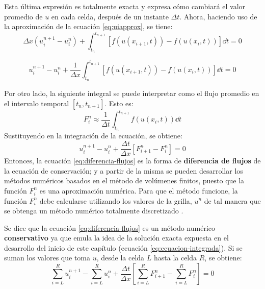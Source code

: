 \documentclass[12pt]{article}
\begin{document}
	Esta última expresión es totalmente exacta y expresa cómo cambiará el valor promedio de $u$ en cada celda, después de un instante $\Delta t$. Ahora, haciendo uso de la aproximación de la ecuación \ref{eq:uiapprox}, se tiene:
	\begin{equation}
		 \Delta x\left( u_{i}^{n+1} - u_{i}^{n}\right)   + \int_{t_n}^{t_{n+1}}\left[ f(u(x_{i+1} ,t)) - f(u(x_{i},t))\right]\dd{t} = 0 
	\end{equation}

	\begin{equation}
		u_{i}^{n+1} - u_{i}^{n} + \frac{1}{\Delta x}\int_{t_n}^{t_{n+1}}\left[ f(u(x_{i+1} ,t)) - f(u(x_{i},t))\right]\dd{t} = 0 
	\end{equation}

	Por otro lado, la siguiente integral se puede interpretar como el flujo promedio en el intervalo temporal $[t_n,t_{n+1}]$. Esto es:
	\begin{equation}
		F_{i}^{n} \approx \frac{1}{\Delta t} \int_{t_n}^{t_{n+1}} f(u(x_i,t)) \dd{t}
		\label{eq:flujo_promedio}
	\end{equation}
	Sustituyendo en la integración de la ecuación, se obtiene:
	\begin{equation}
		u_{i}^{n+1} - u_{i}^{n} + \frac{\Delta t}{\Delta x}\left[ F_{i+1}^n - F_{i}^{n}\right] = 0
		\label{eq:diferencia-flujos}
	\end{equation}
	Entonces, la ecuación \ref{eq:diferencia-flujos} es la forma de \textbf{diferencia de flujos} de la ecuación de conservación; y a partir de la misma se pueden desarrollar los métodos numéricos basados en el método de volúmenes finitos, puesto que la función $F_{i}^{n}$ es una aproximación numérica. Para que el método funcione, la función $F_{i}^{n}$ debe calcularse utilizando los valores de la grilla, $u^{n}$ de tal manera que se obtenga un método numérico totalmente discretizado \cite{LeVeque1998}. 
	
	Se dice que la ecuación \ref{eq:diferencia-flujos} es un método numérico \textbf{conservativo} ya que emula la idea de la solución exacta expuesta en el desarrollo del inicio de este capítulo (ecuación \ref{eq:ecuacion-integrada}). Si se suman los valores que toma $u$, desde la celda $L$ hasta la celda $R$, se obtiene:
	\begin{equation}
		\sum_{i=L}^{R} u_{i}^{n+1} - \sum_{i=L}^{R}  u_{i}^{n} + \frac{\Delta t}{\Delta x}\left[ \sum_{i=L}^{R}F_{i+1}^{n} - \sum_{i=L}^{R}F_{i}^{n}\right] =0
	\end{equation}
		
\end{document}
